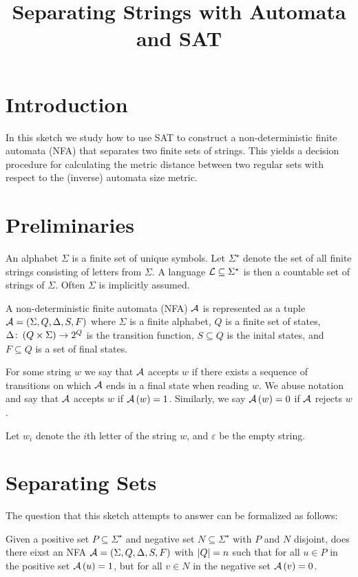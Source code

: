 \documentclass[12pt]{article}
\title{Separating Strings with Automata and SAT}
\date{}
\begin{document}
\maketitle

\section{Introduction}
In this sketch we study
how to use SAT to construct a non-deterministic finite automata (NFA)
that separates two finite sets of strings.
This yields a decision procedure for calculating
the metric distance between two regular sets with respect to the
(inverse) automata size metric.


\section{Preliminaries}
An alphabet \(\Sigma\) is a finite set of unique symbols.
Let \(\Sigma^\star\) denote the set of all finite strings consisting of
letters from \(\Sigma\).
A language \(\mathcal{L} \subseteq \Sigma^\star\) is then
a countable set of strings of \(\Sigma\).
Often \(\Sigma\) is implicitly assumed.

A non-deterministic finite automata (NFA) \(\mathcal{A}\) is represented
as a tuple
\(\mathcal{A} = \left(\Sigma, Q, \Delta, S, F\right)\)
where \(\Sigma\) is a finite alphabet,
\(Q\) is a finite set of states,
\(\Delta \colon \left(Q \times \Sigma\right) \to 2^{Q}\)
is the transition function,
\(S \subseteq Q\) is the inital states,
and \(F \subseteq Q\) is a set of final states.

For some string \(w\) we say that \(\mathcal{A}\) accepts \(w\)
if there exists a sequence of transitions on which \(\mathcal{A}\) ends
in a final state when reading \(w\).
We abuse notation and say
that \(\mathcal{A}\) accepts \(w\) if \(\mathcal{A}\left(w\right) = 1\).
Similarly, we say \(\mathcal{A}\left(w\right) = 0\) if \(\mathcal{A}\) rejects \(w\).

Let \(w_i\) denote the \(i\)th letter of the string \(w\),
and \(\varepsilon\) be the empty string.



\section{Separating Sets}

The question that this sketch attempts to answer can be formalized as follows:

\begin{question}
Given a positive set \(P \subseteq \Sigma^\star\)
and negative set \(N \subseteq \Sigma^\star\)
with \(P\) and \(N\) disjoint,
does there eixst an NFA
\(\mathcal{A} = \left(\Sigma, Q, \Delta, S, F\right)\)
with \(\left\lvert Q\right\rvert = n\)
such that for all \(u \in P\) in the positive set \(\mathcal{A}\left(u\right) = 1\),
but for all \(v \in N\) in the negative set \(\mathcal{A}\left(v\right) = 0\).
\end{question}
\end{document}
